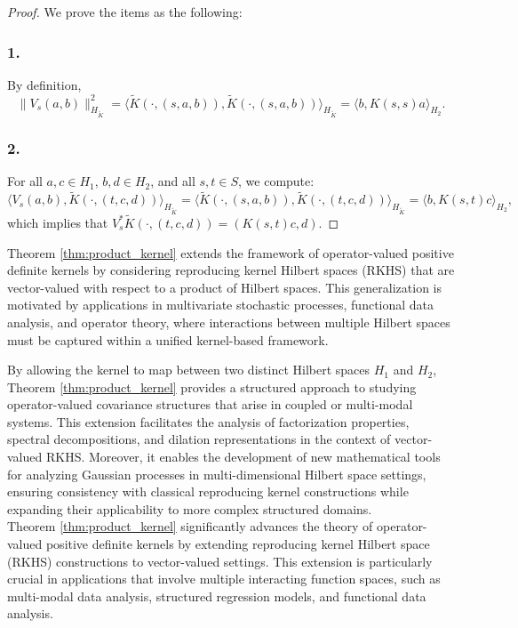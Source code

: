 \documentclass[11pt]{amsart}
\theoremstyle{definition}
\numberwithin{equation}{section}
\begin{document}
\begin{proof}
We prove the items as the following:
\subsubsection*{1.} By definition,
    \[
    \|V_s (a, b)\|_{H_{\tilde{K}}}^2 = \langle \tilde{K}(\cdot, (s, a, b)), \tilde{K}(\cdot, (s, a, b)) \rangle_{H_{\tilde{K}}} = \langle b, K(s, s) a \rangle_{H_2}.
    \]
    
\subsubsection*{2.} For all \( a, c \in H_1 \), \( b, d \in H_2 \), and all \( s, t \in S \), we compute:
    \[
    \langle V_s (a, b), \tilde{K}(\cdot, (t, c, d)) \rangle_{H_{\tilde{K}}} = \langle \tilde{K}(\cdot, (s, a, b)), \tilde{K}(\cdot, (t, c, d)) \rangle_{H_{\tilde{K}}} = \langle b, K(s, t) c \rangle_{H_2},
    \]
    which implies that \( V_s^* \tilde{K}(\cdot, (t, c, d)) = (K(s, t) c, d) \).
\end{proof}
Theorem \ref{thm:product_kernel} extends the framework of operator-valued positive definite kernels by considering reproducing kernel Hilbert spaces (RKHS) that are vector-valued with respect to a product of Hilbert spaces. This generalization is motivated by applications in multivariate stochastic processes, functional data analysis, and operator theory, where interactions between multiple Hilbert spaces must be captured within a unified kernel-based framework.

By allowing the kernel to map between two distinct Hilbert spaces $H_1$ and $H_2$, Theorem \ref{thm:product_kernel} provides a structured approach to studying operator-valued covariance structures that arise in coupled or multi-modal systems. This extension facilitates the analysis of factorization properties, spectral decompositions, and dilation representations in the context of vector-valued RKHS. Moreover, it enables the development of new mathematical tools for analyzing Gaussian processes in multi-dimensional Hilbert space settings, ensuring consistency with classical reproducing kernel constructions while expanding their applicability to more complex structured domains.\\

\noindent
Theorem \ref{thm:product_kernel} significantly advances the theory of operator-valued positive definite kernels by extending reproducing kernel Hilbert space (RKHS) constructions to vector-valued settings. This extension is particularly crucial in applications that involve multiple interacting function spaces, such as multi-modal data analysis, structured regression models, and functional data analysis.
\end{document}
